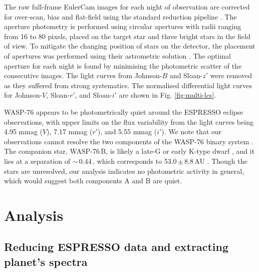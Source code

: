 \documentclass{aa}
\begin{document}

The raw full-frame EulerCam images for each night of observation are corrected for over-scan, bias and flat-field using the standard reduction pipeline \citep{lendl_2012}. The aperture photometry is performed using circular apertures with radii ranging from 16 to 80 pixels, placed on the target star and three bright stars in the field of view. To mitigate the changing position of stars on the detector, the placement of apertures was performed using their astrometric solution \citep{dustin_lang_2010}. The optimal aperture for each night is found by minimising the photometric scatter of the consecutive images. The light curves from Johnson-$B$ and Sloan-$z'$ were removed as they suffered from strong systematics. The normalised differential light curves for Johnson-$V$, Sloan-$r'$, and Sloan-$i'$ are shown in Fig. \ref{fig:multi-lcs}. 

WASP-76 appears to be photometrically quiet around the ESPRESSO eclipse observations, with upper limits on the flux variability from the light curves being 4.95 mmag ($V$), 7.17 mmag ($r'$), and 5.55 mmag ($i'$). We note that our observations cannot resolve the two components of the WASP-76 binary system \citep{wollert2015}. The companion star, WASP-76\,B, is likely a late-G or early K-type dwarf \citep{ehrenreich2020}, and it lies at a separation of $\sim\,$0.44\,\arcsec, which corresponds to 53.0\,$\pm$\,8.8\,AU \citep{ginski2016, ngo2016, bohn2020}. Though the stars are unresolved, our analysis indicates no photometric activity in general, which would suggest both components A and B are quiet. 



\section{Analysis} \label{analysis}


\subsection{Reducing ESPRESSO data and extracting planet's spectra}
\end{document}
